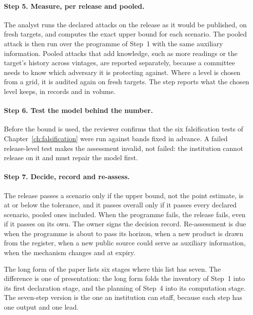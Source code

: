 \paragraph{Step 5. Measure, per release and pooled.} The analyst runs the declared
attacks on the release as it would be published, on fresh targets, and computes the
exact upper bound for each scenario. The pooled attack is then run over the
programme of Step~1 with the same auxiliary information. Pooled attacks that add
knowledge, such as more readings or the target's history across vintages, are
reported separately, because a committee needs to know which adversary it is
protecting against. Where a level is chosen from a grid, it is audited again on fresh
targets. The step reports what the chosen level keeps, in records and in volume.

\paragraph{Step 6. Test the model behind the number.} Before the bound is used, the
reviewer confirms that the six falsification tests of
Chapter~\ref{ch:falsification} were run against bands fixed in advance. A failed
release-level test makes the assessment invalid, not failed: the institution cannot
release on it and must repair the model first.

\paragraph{Step 7. Decide, record and re-assess.} The release passes a scenario only
if the upper bound, not the point estimate, is at or below the tolerance, and it
passes overall only if it passes every declared scenario, pooled ones included. When
the programme fails, the release fails, even if it passes on its own. The owner signs
the decision record. Re-assessment is due when the programme is about to pass its
horizon, when a new product is drawn from the register, when a new public source
could serve as auxiliary information, when the mechanism changes and at expiry.

The long form of the paper lists six stages where this list has seven. The
difference is one of presentation: the long form folds the inventory of Step~1 into
its first declaration stage, and the planning of Step~4 into its computation stage.
The seven-step version is the one an institution can staff, because each step has
one output and one lead.

